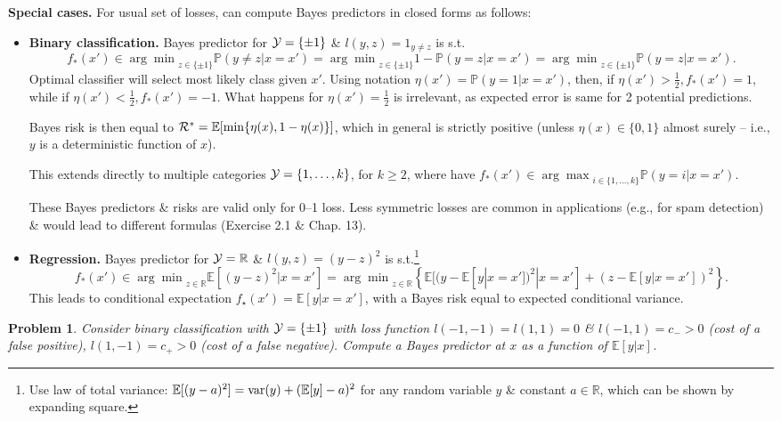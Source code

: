 \documentclass{article}
\newtheorem{problem}{Problem}
\begin{document}
\begin{enumerate}
\begin{itemize}
\begin{itemize}
\begin{itemize}
				{\bf Special cases.} For usual set of losses, can compute Bayes predictors in closed forms as follows:
				\begin{itemize}
					\item {\bf Binary classification.} Bayes predictor for ${\cal Y} = \{\pm1\}$ \& $l(y,z) = 1_{y\ne z}$ is s.t.
					\begin{equation}
						f_*(x')\in{\arg\min}_{z\in\{\pm1\}} \mathbb{P}(y\ne z|x = x') = {\arg\min}_{z\in\{\pm1\}}  1 - \mathbb{P}(y = z|x = x') = {\arg\min}_{z\in\{\pm1\}} \mathbb{P}(y = z|x = x').
					\end{equation}
					Optimal classifier will select most likely class given $x'$. Using notation $\eta(x') = \mathbb{P}(y = 1|x = x')$, then, if $\eta(x') > \frac{1}{2},f_*(x') = 1$, while if $\eta(x') < \frac{1}{2},f_*(x') = -1$. What happens for $\eta(x') = \frac{1}{2}$ is irrelevant, as expected error is same for 2 potential predictions.
					
					Bayes risk is then equal to ${\cal R}^* = \mathbb{E}[\min\{\eta(x),1 - \eta(x)\}]$, which in general is strictly positive (unless $\eta(x)\in\{0,1\}$ almost surely -- i.e., $y$ is a deterministic function of $x$).
					
					This extends directly to multiple categories ${\cal Y} = \{1,\ldots,k\}$, for $k\ge2$, where have $f_*(x')\in{\arg\max}_{i\in\{1,\ldots,k\}} \mathbb{P}(y = i|x = x')$.
					
					These Bayes predictors \& risks are valid only for 0--1 loss. Less symmetric losses are common in applications (e.g., for spam detection) \& would lead to different formulas (Exercise 2.1 \& Chap. 13).
					\item {\bf Regression.} Bayes predictor for ${\cal Y} = \mathbb{R}$ \& $l(y,z) = (y - z)^2$ is s.t.\footnote{Use law of total variance: $\mathbb{E}[(y - a)^2] = {\rm var}(y) + (\mathbb{E}[y] - a)^2$ for any random variable $y$ \& constant $a\in\mathbb{R}$, which can be shown by expanding square.}
					\begin{equation}
						f_*(x')\in{\arg\min}_{z\in\mathbb{R}} \mathbb{E}[(y - z)^2|x = x'] = {\arg\min}_{z\in\mathbb{R}} \left\{\mathbb{E}[(y  - \mathbb{E}[y|x = x'])^2|x = x'] + (z - \mathbb{E}[y|x = x'])^2\right\}.
					\end{equation}
					This leads to conditional expectation $f_\star(x') = \mathbb{E}[y|x = x']$, with a Bayes risk equal to expected conditional variance.
				\end{itemize}
				
				\begin{problem}
					Consider binary classification with ${\cal Y} = \{\pm1\}$ with loss function $l(-1,-1) = l(1,1) = 0$ \& $l(-1,1) = c_- > 0$ (cost of a false positive), $l(1,-1) = c_+ > 0$ (cost of a false negative). Compute a Bayes predictor at $x$ as a function of $\mathbb{E}[y|x]$.
				\end{problem}
				

\end{itemize}
\end{itemize}
\end{itemize}
\end{enumerate}
\end{document}
